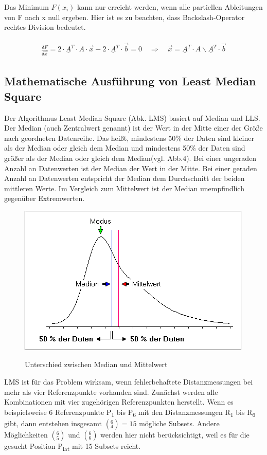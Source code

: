 \noindent
Das Minimum $ F(x_{i}) $ kann nur erreicht werden, wenn alle partiellen Ableitungen von F nach x null ergeben. Hier ist es zu beachten, dass Backslash-Operator rechtes Division bedeutet.

\begin{align}
\begin{split}
\frac{\delta F}{\delta \vec{x}} = 2 \cdot \underline{A}^{T} \cdot A \cdot \vec{x}-2 \cdot \underline{A}^{T} \cdot \vec{b} = 0 
\quad \Rightarrow  \quad
\vec{x}= \underline{A}^{T} \cdot A \backslash \underline{A}^{T} \cdot \vec{b}
\end{split}
\end{align}




\subsection{Mathematische Ausführung von Least Median Square }
Der Algorithmus Least Median Square (Abk. LMS) basiert auf Median und LLS. Der Median (auch Zentralwert genannt) ist der Wert in der Mitte einer der Größe nach geordneten Datenreihe. Das heißt, mindestens 50\% der Daten sind kleiner als der Median oder gleich dem Median und mindestens 50\% der Daten sind größer als der Median oder gleich dem Median(vgl. Abb.4). Bei einer ungeraden Anzahl an Datenwerten ist der Median der Wert in der Mitte. Bei einer geraden Anzahl an Datenwerten entspricht der Median dem Durchschnitt der beiden mittleren Werte. Im Vergleich zum Mittelwert ist der Median unempfindlich gegenüber Extremwerten.
\begin{figure}[H]
	\centering
	\includegraphics[scale=0.6]{img/Medianwert.png}\\
	\caption{Unterschied zwischen Median und Mittelwert}
\end{figure}
\noindent
LMS ist für das Problem wirksam, wenn fehlerbehaftete Distanzmessungen bei mehr als vier Referenzpunkte vorhanden sind. Zunächst werden alle Kombinationen mit vier zugehörigen Referenzpunkten herstellt. Wenn es beispielsweise 6 Referenzpunkte P\textsubscript{1} bis P\textsubscript{6} mit den Distanzmessungen R\textsubscript{1} bis R\textsubscript{6} gibt, dann entstehen insgesamt $(^6_4) = 15$ mögliche Subsets. Andere Möglichkeiten $(^6_5)$ und $(^6_6)$ werden hier nicht berücksichtigt, weil es für die gesucht Position P\textsubscript{lat} mit 15 Subsets reicht.
